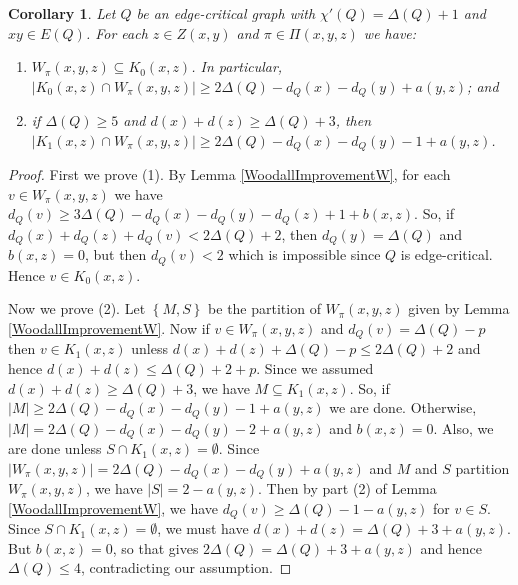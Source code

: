 \documentclass[12pt,reqno]{amsart}
\theoremstyle{plain}
\newtheorem{cor}[thm]{Corollary}
\theoremstyle{definition}
\theoremstyle{remark}
\newcommand{\set}[1]{\left\{ #1 \right\}}
\newcommand{\card}[1]{\left|#1\right|}
\begin{document}
\begin{cor}\label{SigmaW}
Let $Q$ be an edge-critical graph with $\chi'(Q) = \Delta(Q) + 1$ and $xy \in E(Q)$.  For each $z \in Z(x, y)$ and $\pi \in \Pi(x,y,z)$ we have:
\begin{enumerate}
\item $W_\pi(x, y, z) \subseteq K_0(x, z)$.  In particular, $\card{K_0(x, z) \cap W_\pi(x, y, z)} \ge 2\Delta(Q) - d_Q(x) - d_Q(y) + a(y, z)$; and
\item if $\Delta(Q) \ge 5$ and $d(x) + d(z) \ge \Delta(Q) + 3$, then $\card{K_1(x, z) \cap W_\pi(x, y, z)} \ge 2\Delta(Q) - d_Q(x) - d_Q(y) - 1 + a(y, z)$.
\end{enumerate}
\end{cor}
\begin{proof}
First we prove (1). By Lemma \ref{WoodallImprovementW}, for each $v \in W_\pi(x, y, z)$ we have $d_Q(v) \ge 3\Delta(Q) - d_Q(x) - d_Q(y) - d_Q(z) + 1 + b(x, z)$.  So, if $d_Q(x) + d_Q(z) + d_Q(v) < 2\Delta(Q) + 2$, then $d_Q(y) = \Delta(Q)$ and $b(x, z) = 0$, but then $d_Q(v) < 2$ which is impossible since $Q$ is edge-critical.  Hence $v \in K_0(x, z)$.

Now we prove (2). Let $\set{M, S}$ be the partition of $W_\pi(x, y, z)$ given by Lemma \ref{WoodallImprovementW}.  Now if $v \in W_\pi(x, y, z)$ and $d_Q(v) = \Delta(Q) - p$ then $v \in K_1(x, z)$ unless $d(x) + d(z) + \Delta(Q) - p \le 2\Delta(Q) + 2$ and hence $d(x) + d(z) \le \Delta(Q) + 2 + p$.  Since we assumed $d(x) + d(z) \ge \Delta(Q) + 3$, we have $M \subseteq K_1(x, z)$.  So, if $\card{M} \ge 2\Delta(Q) - d_Q(x) - d_Q(y) - 1 + a(y, z)$ we are done.  Otherwise, $\card{M} = 2\Delta(Q) - d_Q(x) - d_Q(y) - 2 + a(y, z)$ and $b(x, z) = 0$.  Also, we are done unless $S \cap  K_1(x, z) = \emptyset$. Since $\card{W_\pi(x, y, z)} = 2\Delta(Q) - d_Q(x) - d_Q(y) + a(y, z)$ and $M$ and $S$ partition $W_\pi(x, y, z)$, we have $\card{S} = 2 - a(y, z)$. Then by part (2) of Lemma \ref{WoodallImprovementW}, we have $d_Q(v) \ge \Delta(Q) - 1 - a(y, z)$ for $v \in S$.  Since $S \cap  K_1(x, z) = \emptyset$, we must have $d(x) + d(z) = \Delta(Q) + 3 + a(y, z)$.  But $b(x, z) = 0$, so that gives $2\Delta(Q) = \Delta(Q) + 3 + a(y, z)$ and hence $\Delta(Q) \le 4$, contradicting our assumption.
\end{proof}
\end{document}
